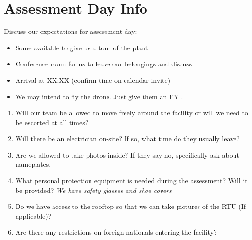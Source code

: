 \documentclass[./main.tex]{subfiles}
\begin{document}
\section*{Assessment Day Info}

\noindent Discuss our expectations for assessment day:

\begin{itemize}
    \item Some available to give us a tour of the plant
    \item Conference room for us to leave our belongings and discuss
    \item Arrival at XX:XX (confirm time on calendar invite)
    \item We may intend to fly the drone. Just give them an FYI. 
\end{itemize}

\begin{enumerate}[leftmargin=*]
\item Will our team be allowed to move freely around the facility or will we need to be escorted at all times? 

\vspace{\answerspace}

\item Will there be an electrician on-site? If so, what time do they usually leave? 

\vspace{\answerspace}

\item Are we allowed to take photos inside? If they say no, specifically ask about nameplates. 

\vspace{\answerspace}

\item What personal protection equipment is needed during the assessment? Will it be provided? \emph{We have safety glasses and shoe covers}

\vspace{\answerspace}

\item Do we have access to the rooftop so that we can take pictures of the RTU (If applicable)?

\vspace{\answerspace}

\item Are there any restrictions on foreign nationals entering the facility? 
\end{enumerate}


\end{document}
